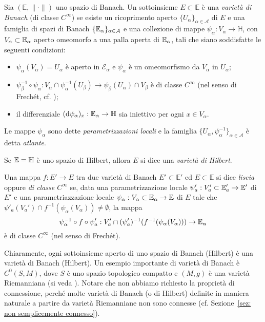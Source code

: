 \begin{defi}
Sia \((\mathbb{E}, \|\cdot \|)\) uno spazio di Banach. Un sottoinsieme \(E \subset \mathbb{E}\) è una \textit{varietà di Banach} (di classe \(C^\infty\)) se esiste un ricoprimento aperto \(\{U_\alpha\}_{\alpha \in \mathcal{A}}\) di \(E\) e una famiglia di spazi di Banach \(\{\mathbb{E}_\alpha\}_{\alpha \in \mathcal{A}}\) e una collezione di mappe \(\psi_\alpha : V_\alpha \to \mathbb{H}\), con \(V_\alpha \subset \mathbb{E}_\alpha\) aperto omeomorfo a una palla aperta di \(\mathbb{E}_\alpha\), tali che siano soddisfatte le seguenti condizioni:
\begin{itemize}
	\item \(\psi_\alpha(V_\alpha) = U_\alpha\) è aperto in \(\mathcal{E}_\alpha\) e \(\psi_\alpha\) è un omeomorfismo da \(V_\alpha\) in \(U_\alpha\);
	\item \(\psi^{-1}_\beta \circ \psi_\alpha: V_\alpha \cap \psi^{-1}_\alpha(U_\beta) \to \psi_\beta(U_\alpha) \cap V_\beta\) è di classe \(C^\infty\) (nel senso di Frechét, cf. \cite[Definition 1.1]{ambrosetti2007nonlinear});
	\item il differenziale \((\mathrm{d} \psi_\alpha)_x: \mathbb{E}_\alpha \to \mathbb{H}\) sia iniettivo per ogni \(x \in V_\alpha\).
\end{itemize}
Le mappe \(\psi_\alpha\) sono dette \textit{parametrizzazioni locali} e la famiglia \(\{U_\alpha,\psi^{-1}_\alpha\}_{\alpha \in \mathcal{A}}\) è detta \textit{atlante}. 

Se \(\mathbb{E}= \mathbb{H}\) è uno spazio di Hilbert, allora \(E\) si dice una \textit{varietà di Hilbert}.

Una mappa \(f: E' \to E\) tra due varietà di Banach \(E' \subset \mathbb{E}'\) ed \(E\subset \mathbb{E}\) si dice \textit{liscia} oppure \textit{di classe \(C^\infty\)} se, data una parametrizzazione locale  \(\psi'_a:V_a' \subset \mathbb{E}'_a \to \mathbb{E}'\) di \(E'\) e una parametriazzazione locale \(\psi_\alpha:V_\alpha \subset \mathbb{E}_\alpha \to \mathbb{E}\) di \(E\) tale che \(\psi'_a(V_a') \cap f^{-1}(\psi_\alpha(V_\alpha)) \neq \emptyset\), la mappa
\[
	\psi_\alpha^{-1} \circ f \circ \psi_a': V_a' \cap (\psi_a')^{-1}(f^{-1}(\psi_\alpha(V_\alpha))) \to \mathbb{E}_\alpha
\]
è di classe \(C^\infty\) (nel senso di Frechét).
\end{defi}

Chiaramente, ogni sottoinsieme aperto di uno spazio di Banach (Hilbert) è una varietà di Banach (Hilbert). Un esempio importante di varietà di Banach è \(C^0(S,M)\), dove \(S\) è uno spazio topologico compatto e \((M,g)\) è una varietà Riemanniana (si veda \cite{eells1958geometry}). Notare che non abbiamo richiesto la proprietà di connessione, perché molte varietà di Banach (o di Hilbert) definite in maniera naturale a partire da varietà Riemanniane non sono connesse (cf. Sezione~\ref{sez: non semplicemente connesso}). 


